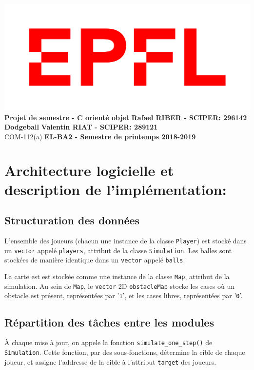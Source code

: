 \documentclass[a4paper, 11pt]{article}
\begin{document}
\noindent \includegraphics[scale=0.2]{figures/logo.png}\\
\large\textbf{Projet de semestre - C\raisebox{.5\height}{\scalebox{.5}{++}} orienté objet} \hfill \textbf{Rafael RIBER  - SCIPER: 296142} \\
\large\textbf{Dodgeball} \hfill \hfill \textbf{Valentin RIAT - SCIPER: 289121}\\
\normalsize COM-112(a) \hfill \textbf{EL-BA2 - Semestre de printemps 2018-2019}
\section{Architecture logicielle et description de l’implémentation:}

\subsection{Structuration des données}

L'ensemble des joueurs (chacun une instance de la classe \texttt{Player}) est stocké dans un \texttt{vector} appelé \texttt{players}, attribut de la classe \texttt{Simulation}. Les balles sont stockées de manière identique dans un \texttt{vector} appelé \texttt{balls}.

La carte est est stockée comme une instance de la classe \texttt{Map}, attribut de la simulation. Au sein de \texttt{Map}, le \texttt{vector} 2D \texttt{obstacleMap} stocke les cases où un obstacle est présent, représentées par '\texttt{1}', et les cases libres, représentées par '\texttt{0}'.

\subsection{Répartition des tâches entre les modules}

À chaque mise à jour, on appele la fonction \texttt{simulate\_one\_step()} de \texttt{Simulation}. Cette fonction, par des sous-fonctions, détermine la cible de chaque joueur, et assigne l'addresse de la cible à l'attribut \texttt{target} des joueurs. 
\end{document}
